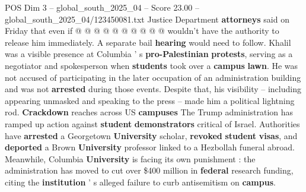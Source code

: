 \begin{textsample}{POS Dim 3 – global\_south\_2025\_04 – Score 23.00 – global\_south\_2025\_04/123450081.txt}
Justice Department \textbf{attorneys} said on Friday that even if @ @ @ @ @ @ @ @ @ @ wouldn't have the authority to release him immediately.
A separate bail \textbf{hearing} would need to follow.
Khalil was a visible presence at Columbia ' s \textbf{pro-Palestinian} \textbf{protests}, serving as a negotiator and spokesperson when \textbf{students} took over a \textbf{campus} \textbf{lawn}.
He was not accused of participating in the later occupation of an administration building and was not \textbf{arrested} during those events.
Despite that, his visibility -- including appearing unmasked and speaking to the press -- made him a political lightning rod. \textbf{Crackdown} reaches across US \textbf{campuses} The Trump administration has ramped up action against \textbf{student} \textbf{demonstrators} critical of Israel.
Authorities have \textbf{arrested} a Georgetown \textbf{University} scholar, \textbf{revoked} \textbf{student} \textbf{visas}, and \textbf{deported} a Brown \textbf{University} professor linked to a Hezbollah funeral abroad.
Meanwhile, Columbia \textbf{University} is facing its own punishment : the administration has moved to cut over \$400 million in \textbf{federal} research funding, citing the \textbf{institution} ' s alleged failure to curb antisemitism on \textbf{campus}.

\end{textsample}

